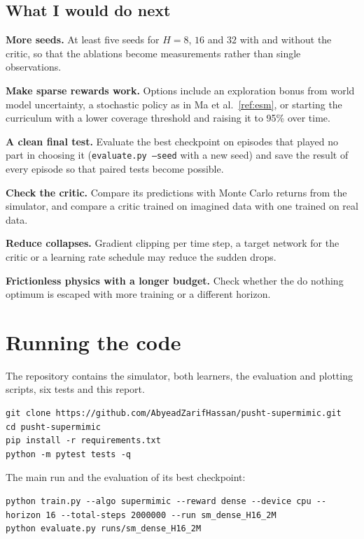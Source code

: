\documentclass[11pt,a4paper]{article}
\renewcommand{\cite}[1]{\ref{ref:#1}}
\begin{document}
\subsection{What I would do next}

\textbf{More seeds.} At least five seeds for $H=8$, $16$ and $32$ with and without the critic, so
that the ablations become measurements rather than single observations.

\textbf{Make sparse rewards work.} Options include an exploration bonus from world model
uncertainty, a stochastic policy as in Ma et al.~\cite{esm}, or starting the curriculum with a
lower coverage threshold and raising it to 95\% over time.

\textbf{A clean final test.} Evaluate the best checkpoint on episodes that played no part in
choosing it (\texttt{evaluate.py --seed} with a new seed) and save the result of every episode so
that paired tests become possible.

\textbf{Check the critic.} Compare its predictions with Monte Carlo returns from the simulator, and
compare a critic trained on imagined data with one trained on real data.

\textbf{Reduce collapses.} Gradient clipping per time step, a target network for the critic or a
learning rate schedule may reduce the sudden drops.

\textbf{Frictionless physics with a longer budget.} Check whether the do nothing optimum is escaped
with more training or a different horizon.

\section{Running the code}
\label{sec:running}

The repository contains the simulator, both learners, the evaluation and plotting scripts, six
tests and this report.

\begin{lstlisting}
git clone https://github.com/AbyeadZarifHassan/pusht-supermimic.git
cd pusht-supermimic
pip install -r requirements.txt
python -m pytest tests -q
\end{lstlisting}

The main run and the evaluation of its best checkpoint:

\begin{lstlisting}
python train.py --algo supermimic --reward dense --device cpu --horizon 16 --total-steps 2000000 --run sm_dense_H16_2M
python evaluate.py runs/sm_dense_H16_2M
\end{lstlisting}
\end{document}
